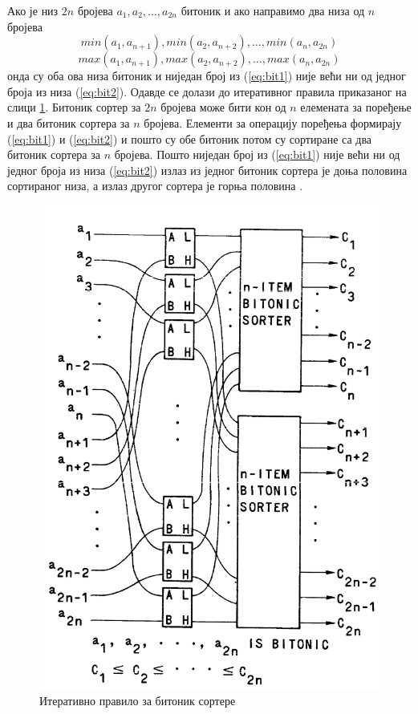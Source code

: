 \documentclass[12pt, a4paper]{article}
\theoremstyle{definition}
\begin{document}
Ако је низ $2n$ бројева $a_1, a_2, \dots, a_{2n}$ битоник и ако направимо два низа од $n$ бројева
\begin{equation}
 min(a_1, a_{n+1}), min(a_2, a_{n+2}), \dots, min(a_n, a_{2n})
 \label{eq:bit1}
\end{equation}
\begin{equation}
 max(a_1, a_{n+1}), max(a_2, a_{n+2}), \dots, max(a_n, a_{2n})
 \label{eq:bit2}
\end{equation}
онда су оба ова низа битоник и ниједан број из (\ref{eq:bit1}) није већи ни од једног броја из низа (\ref{eq:bit2}). Одавде се долази до итеративног правила приказаног на слици \ref{fig:batcherIter}. Битоник сортер за $2n$ бројева може бити кон од $n$ елемената за поређење и два битоник сортера за $n$ бројева. Елементи за операцију поређења формирају (\ref{eq:bit1}) и (\ref{eq:bit2}) и пошто су обе битоник потом су сортиране са два битоник сортера за $n$ бројева. Пошто ниједан број из (\ref{eq:bit1}) није већи ни од једног броја из низа (\ref{eq:bit2}) излаз из једног битоник сортера је доња половина сортираног низа, а излаз другог сортера је горња половина \cite{bitonicBatcher}.

\begin{figure}[H]
  \centering
      \includegraphics[scale=0.4]{slike/batcherIter}
  \caption{Итеративно правило за битоник сортере}
  \label{fig:batcherIter}
\end{figure}
\end{document}
